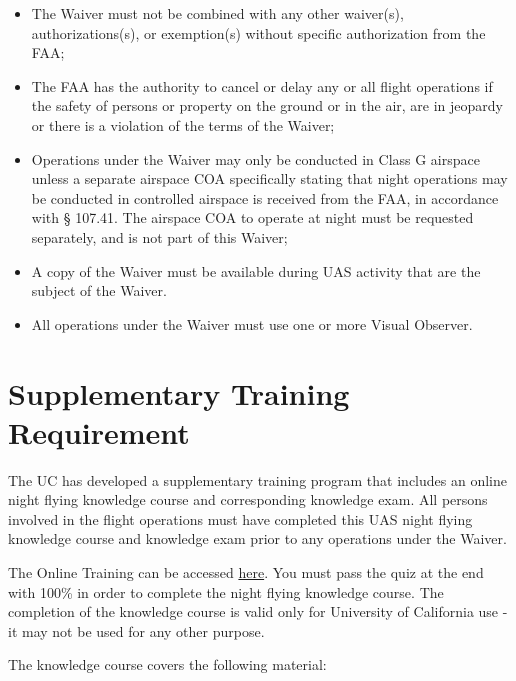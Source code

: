 \documentclass[
]{book}
\providecommand{\tightlist}{%
  \setlength{\itemsep}{0pt}\setlength{\parskip}{0pt}}
\begin{document}
\begin{itemize}
\tightlist
\item
  The Waiver must not be combined with any other waiver(s), authorizations(s), or exemption(s) without specific authorization from the FAA;
\item
  The FAA has the authority to cancel or delay any or all flight operations if the safety of persons or property on the ground or in the air, are in jeopardy or there is a violation of the terms of the Waiver;
\item
  Operations under the Waiver may only be conducted in Class G airspace unless a separate airspace COA specifically stating that night operations may be conducted in controlled airspace is received from the FAA, in accordance with § 107.41. The airspace COA to operate at night must be requested separately, and is not part of this Waiver;
\item
  A copy of the Waiver must be available during UAS activity that are the subject of the Waiver.
\item
  All operations under the Waiver must use one or more Visual Observer.
\end{itemize}

\hypertarget{s29-tr}{%
\section{Supplementary Training Requirement}\label{s29-tr}}

The UC has developed a supplementary training program that includes an online night flying knowledge course and corresponding knowledge exam. All persons involved in the flight operations must have completed this UAS night flying knowledge course and knowledge exam prior to any operations under the Waiver.

The Online Training can be accessed \href{https://docs.google.com/presentation/d/e/2PACX-1vSfIkWTp24UkUPKk82TTK3Mw_Yp_ScsVnISSmLUjcd-OB7csbv88CxzAgyx6ZbznOSZZCVuDs_g1AIf/pub?start=false\&loop=false\&delayms=3000}{here}. You must pass the quiz at the end with 100\% in order to complete the night flying knowledge course. The completion of the knowledge course is valid only for University of California use - it may not be used for any other purpose.

The knowledge course covers the following material:
\end{document}
